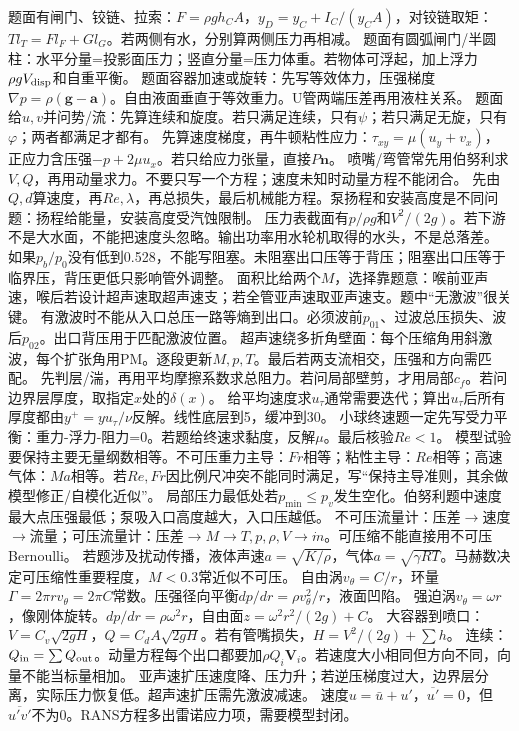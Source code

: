 题面有闸门、铰链、拉索：$F=\rho gh_CA$，$y_D=y_C+I_C/(y_CA)$，对铰链取矩：$T l_T=F l_F+G l_G$。若两侧有水，分别算两侧压力再相减。
题面有圆弧闸门/半圆柱：水平分量=投影面压力；竖直分量=压力体重。若物体可浮起，加上浮力$\rho gV_{\rm disp}$和自重平衡。
题面容器加速或旋转：先写等效体力，压强梯度$\nabla p=\rho(\bm g-\bm a)$。自由液面垂直于等效重力。U管两端压差再用液柱关系。
题面给$u,v$并问势/流：先算连续和旋度。若只满足连续，只有$\psi$；若只满足无旋，只有$\varphi$；两者都满足才都有。
先算速度梯度，再牛顿粘性应力：$\tau_{xy}=\mu(u_y+v_x)$，正应力含压强$-p+2\mu u_x$。若只给应力张量，直接$P\bm n$。
喷嘴/弯管常先用伯努利求$V,Q$，再用动量求力。不要只写一个方程；速度未知时动量方程不能闭合。
先由$Q,d$算速度，再$Re,\lambda$，再总损失，最后机械能方程。泵扬程和安装高度是不同问题：扬程给能量，安装高度受汽蚀限制。
压力表截面有$p/\rho g$和$V^2/(2g)$。若下游不是大水面，不能把速度头忽略。输出功率用水轮机取得的水头，不是总落差。
如果$p_b/p_0$没有低到0.528，不能写阻塞。未阻塞出口压等于背压；阻塞出口压等于临界压，背压更低只影响管外调整。
面积比给两个$M$，选择靠题意：喉前亚声速，喉后若设计超声速取超声速支；若全管亚声速取亚声速支。题中“无激波”很关键。
有激波时不能从入口总压一路等熵到出口。必须波前$p_{01}$、过波总压损失、波后$p_{02}$。出口背压用于匹配激波位置。
超声速绕多折角壁面：每个压缩角用斜激波，每个扩张角用PM。逐段更新$M,p,T$。最后若两支流相交，压强和方向需匹配。
先判层/湍，再用平均摩擦系数求总阻力。若问局部壁剪，才用局部$c_f$。若问边界层厚度，取指定$x$处的$\delta(x)$。
给平均速度求$u_\tau$通常需要迭代；算出$u_\tau$后所有厚度都由$y^+=yu_\tau/\nu$反解。线性底层到5，缓冲到30。
小球终速题一定先写受力平衡：重力-浮力-阻力=0。若题给终速求黏度，反解$\mu$。最后核验$Re<1$。
模型试验要保持主要无量纲数相等。不可压重力主导：$Fr$相等；粘性主导：$Re$相等；高速气体：$Ma$相等。若$Re,Fr$因比例尺冲突不能同时满足，写“保持主导准则，其余做模型修正/自模化近似”。
局部压力最低处若$p_{\min}\le p_v$发生空化。伯努利题中速度最大点压强最低；泵吸入口高度越大，入口压越低。
不可压流量计：压差$\to$速度$\to$流量；可压流量计：压差$\to M\to T,p,\rho,V\to \dot m$。可压缩不能直接用不可压Bernoulli。
若题涉及扰动传播，液体声速$a=\sqrt{K/\rho}$，气体$a=\sqrt{\gamma RT}$。马赫数决定可压缩性重要程度，$M<0.3$常近似不可压。
自由涡$v_\theta=C/r$，环量$\Gamma=2\pi r v_\theta=2\pi C$常数。压强径向平衡$dp/dr=\rho v_\theta^2/r$，液面凹陷。
强迫涡$v_\theta=\omega r$，像刚体旋转。$dp/dr=\rho\omega^2r$，自由面$z=\omega^2r^2/(2g)+C$。
大容器到喷口：$V=C_v\sqrt{2gH}$，$Q=C_dA\sqrt{2gH}$。若有管嘴损失，$H=V^2/(2g)+\sum h$。
连续：$Q_{\rm in}=\sum Q_{\rm out}$。动量方程每个出口都要加$\rho Q_i\bm V_i$。若速度大小相同但方向不同，向量不能当标量相加。
亚声速扩压速度降、压力升；若逆压梯度过大，边界层分离，实际压力恢复低。超声速扩压需先激波减速。
速度$u=\bar u+u'$，$\overline{u'}=0$，但$\overline{u'v'}$不为0。RANS方程多出雷诺应力项，需要模型封闭。

